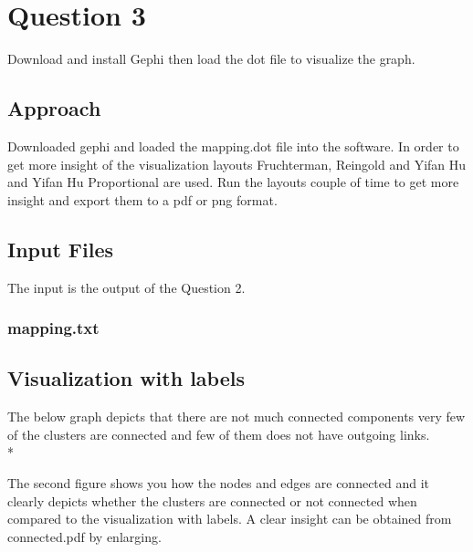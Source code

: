 \documentclass[12pt]{article}
\begin{document}
\section{Question 3}
Download and install Gephi then load the dot file to visualize the graph.
\subsection{Approach}
Downloaded gephi and loaded the mapping.dot file into the software. In order to get more insight of the visualization layouts Fruchterman, Reingold and Yifan  Hu and Yifan Hu Proportional are used. Run the layouts couple of time to get more insight and export them to a pdf or png format.
\subsection{Input Files}
The input is the output of the Question 2.
\subsubsection{mapping.txt}

\newpage

\subsection{Visualization with labels}
The below graph depicts that there are not much connected components very few of the clusters are connected and few of them does not have outgoing links. \\*

The second figure shows you how the nodes and edges are connected and it clearly depicts whether the clusters are connected or not connected when compared to the visualization with labels. A clear insight can be obtained from connected.pdf by enlarging.


\newpage
\end{document}
